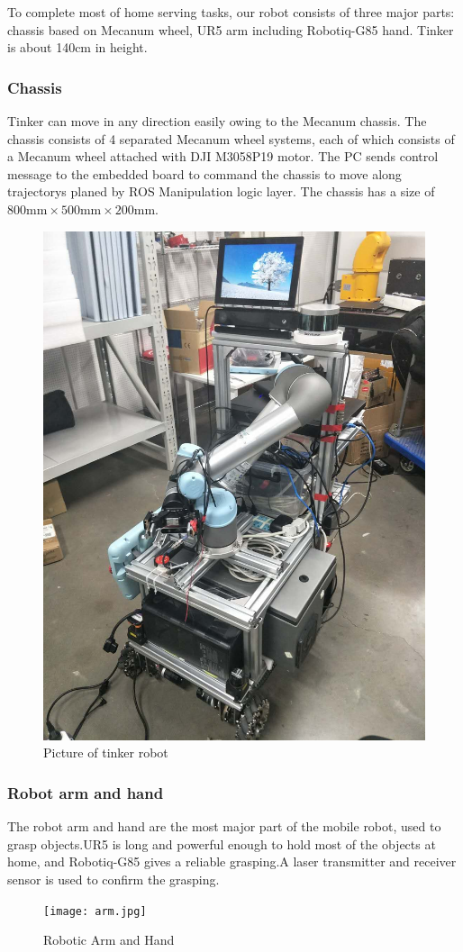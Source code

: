 To complete most of home serving tasks, our robot consists of three major parts: chassis based on Mecanum wheel, UR5 arm including Robotiq-G85 hand. Tinker is about 140cm in height. 
\subsubsection{Chassis}
Tinker can move in any direction easily owing to the Mecanum chassis. The chassis consists of 4 separated Mecanum wheel systems, each of which consists of a Mecanum wheel attached with DJI M3058P19 motor. The PC sends control message to the embedded board to command the chassis to move along trajectorys planed by ROS Manipulation logic layer. The chassis has a size of $800\text{mm} \times 500\text{mm}\times 200\text{mm}$.
\begin{figure}[!t]
\centering
\includegraphics[scale=0.2]{images/tinker.jpg}
    \caption{Picture of tinker robot}
\end{figure}

\subsubsection{Robot arm and hand}
The robot arm and hand are the most major part of the mobile robot, used to grasp objects.UR5 is long and powerful enough to hold most of the objects at home, and Robotiq-G85 gives a reliable grasping.A laser transmitter and receiver sensor is used to confirm the grasping.
\begin{figure}[!t]
	\centering
    \texttt{[image: arm.jpg]}
    \caption{Robotic Arm and Hand}
\end{figure}

